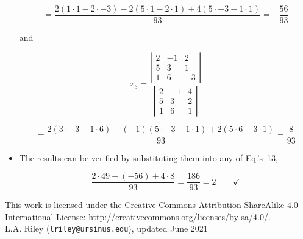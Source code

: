 \documentclass[12pt]{article}
\begin{document}
\begin{itemize}
\begin{equation}
=  
\frac{
  2 (1 \cdot 1 - 2 \cdot -3)
- 2 (5 \cdot 1 - 2 \cdot  1)
+ 4 (5 \cdot -3 - 1 \cdot 1)
}{93} 
= -\frac{56}{93}
\end{equation}

and

\begin{equation}
x_3 =
\frac{
\left|
\begin{array}{ccc}
 2 & -1 &  2 \\
 5 &  3 &  1 \\
 1 &  6 & -3
\end{array}
\right|
}{
\left|
\begin{array}{ccc}
 2 & -1 & 4 \\
 5 &  3 & 2 \\
 1 &  6 & 1
\end{array}
\right|
}
\end{equation}

\begin{equation}
=
\frac{
    2 (3 \cdot -3 - 1 \cdot 6)
- (-1)(5 \cdot -3 - 1 \cdot 1)
+   2 (5 \cdot  6 - 3 \cdot 1)
}
{93}
=
\frac{8}{93}
\end{equation}

\item The results can be verified by substituting them into any of
Eq.'s~13,%

\begin{equation}
\frac{2 \cdot 49 - (-56) + 4 \cdot 8}{93} = \frac{186}{93} = 2
\hspace{24pt}\checkmark
\end{equation}

\end{itemize}

{\footnotesize
  \noindent
  \hrulefill
  
  \noindent
  This work is licensed under the Creative Commons
  Attribution-ShareAlike 4.0 International License: 
  \url{http://creativecommons.org/licenses/by-sa/4.0/}.\\

  \noindent
  L.A. Riley (\texttt{lriley@ursinus.edu}), updated June 2021
}
\end{document}
